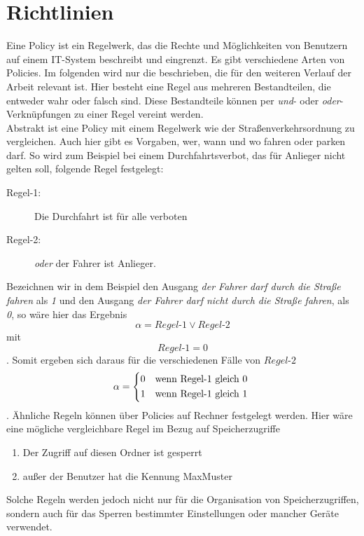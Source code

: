 \chapter{Richtlinien} \label{Policies}
Eine Policy ist ein Regelwerk, das die Rechte und Möglichkeiten von Benutzern auf einem IT-System beschreibt und eingrenzt. Es gibt verschiedene Arten von Policies. Im folgenden wird nur die beschrieben, die für den weiteren Verlauf der Arbeit relevant ist. Hier besteht eine Regel aus mehreren Bestandteilen, die entweder wahr oder falsch sind. Diese Bestandteile können per \textit{und}- oder \textit{oder}-Verknüpfungen zu einer Regel vereint werden.\\
Abstrakt ist eine Policy mit einem Regelwerk wie der Straßenverkehrsordnung zu vergleichen. Auch hier gibt es Vorgaben, wer, wann und wo fahren oder parken darf. So wird zum Beispiel bei einem Durchfahrtsverbot, das für Anlieger nicht gelten soll, folgende Regel festgelegt:
\begin{description}
	\item[Regel-1: ] Die Durchfahrt ist für alle verboten
	\item[Regel-2: ] \textit{oder} der Fahrer ist Anlieger.
\end{description}
Bezeichnen wir in dem Beispiel den Ausgang \textit{der Fahrer darf durch die Straße fahren} als \textit{1} und den Ausgang \textit{der Fahrer darf nicht durch die Straße fahren}, als \textit{0}, so wäre hier das Ergebnis
\begin{equation*}
	\alpha = Regel\text{-}1 \vee Regel\text{-}2
\end{equation*} mit 
\begin{equation*}
	Regel\text{-}1=0
\end{equation*}. Somit ergeben sich daraus für die verschiedenen Fälle von $Regel$-$2$
\[
	\alpha = 
		\begin{dcases*}
			0 & wenn Regel\text{-}1 gleich 0\\
			1 & wenn Regel\text{-}1 gleich 1
		\end{dcases*}
\]
. Ähnliche Regeln können über Policies auf Rechner festgelegt werden. Hier wäre eine mögliche vergleichbare Regel im Bezug auf Speicherzugriffe
\begin{enumerate}
	\item Der Zugriff auf diesen Ordner ist gesperrt
	\item außer der Benutzer hat die Kennung MaxMuster
\end{enumerate}
Solche Regeln werden jedoch nicht nur für die Organisation von Speicherzugriffen, sondern auch für das Sperren bestimmter Einstellungen oder mancher Geräte verwendet.